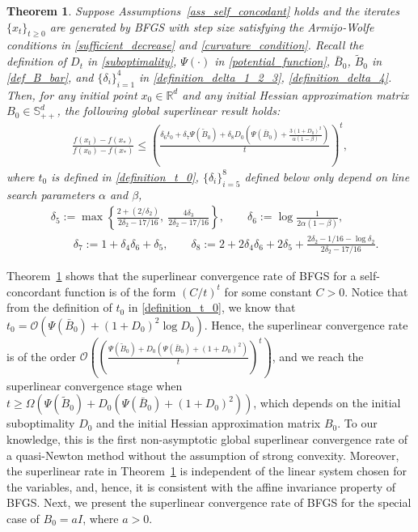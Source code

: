 \documentclass[11pt,letterpaper]{article}
\newcommand\0{{\Vector{0}}}
\newcommand\1{{\Vector{1}}}
\newtheorem{theorem}{Theorem}
\numberwithin{assumption}{section}
\numberwithin{definition}{section}
\numberwithin{theorem}{section}
\numberwithin{remark}{section}
\begin{document}
\begin{theorem}\label{thm:superlinear_rate_2}
    Suppose Assumptions~\ref{ass_self_concodant} holds and the iterates $\{x_t\}_{t \geq 0}$ are generated by BFGS with step size satisfying the Armijo-Wolfe conditions in \eqref{sufficient_decrease} and \eqref{curvature_condition}. Recall the definition of $D_t$ in \eqref{suboptimality}, $\Psi(\cdot)$ in \eqref{potential_function}, $\bar{B}_0$, $\tilde{B}_0$ in \eqref{def_B_bar}, and $\{\delta_i\}_{i = 1}^{4}$ in \eqref{definition_delta_1_2_3}, \eqref{definition_delta_4}. Then, for any initial point $x_0 \in \mathbb{R}^{d}$ and any initial Hessian approximation matrix $B_0 \in \mathbb{S}^d_{++}$, the following global superlinear result holds:
    \begin{equation*}
    \begin{split}
        \frac{f(x_t) - f(x_*)}{f(x_0) - f(x_*)} \leq  \left(\frac{\delta_6 t_0 + \delta_7 \Psi(\tilde{B}_0) + \delta_8 D_0 (\Psi(\bar{B}_{0}) + \frac{3(1 + D_0)^2}{\alpha(1 - \beta)})}{t}\right)^{t},
    \end{split}
    \end{equation*}
    where $t_0$ is defined in \eqref{definition_t_0}, $\{\delta_i\}_{i = 5}^{8}$ defined below only depend on line search parameters $\alpha$ and $\beta$,
    \begin{equation}\label{def_delta_5678}
    \begin{split}
        & \delta_5 := \max\left\{\frac{2 + ({2}/{\delta_2})}{2\delta_2 - 17/16}, \ \frac{4\delta_3}{2\delta_2 - 17/16}\right\}, \qquad \delta_6 := \log{\frac{1}{2\alpha(1 - \beta)}},\\
        &  \qquad \delta_7 := 1 + \delta_4\delta_6 + \delta_5, \qquad \delta_8 := 2 + 2\delta_4\delta_6 + 2\delta_5 + \frac{2\delta_2 - 1/16 - \log{\delta_2}}{2\delta_2 - 17/16}.
    \end{split}
    \end{equation}
\end{theorem}

Theorem~\ref{thm:superlinear_rate_2} shows that the superlinear convergence rate of BFGS for a self-concordant function is of the form $({C}/{t})^{t}$ for some constant $C > 0$. Notice that from the definition of $t_0$ in \eqref{definition_t_0}, we know that $t_0 = \mathcal{O}(\Psi(\bar{B}_{0}) + (1 + D_0)^2\log{D_0})$. Hence, the superlinear convergence rate is of the order
$
    \mathcal{O}((\frac{\Psi(\tilde{B}_0) + D_0 (\Psi(\bar{B}_{0}) + (1 + D_0)^2)}{t})^t)$,
and we reach the superlinear convergence stage when $
    t \geq \Omega(\Psi(\tilde{B}_0) + D_0 (\Psi(\bar{B}_{0}) + (1 + D_0)^2))$,
which depends on the initial suboptimality $D_0$ and the initial Hessian approximation matrix $B_0$. To our knowledge, this is the first non-asymptotic global superlinear convergence rate of a quasi-Newton method without the assumption of strong convexity. Moreover, the superlinear rate in Theorem~\ref{thm:superlinear_rate_2} is independent of the linear system chosen for the variables, and, hence, it is consistent with the affine invariance property of BFGS. Next, we present the superlinear convergence rate of BFGS for the special case of $B_0 = a I$, where $a > 0$.
\end{document}
